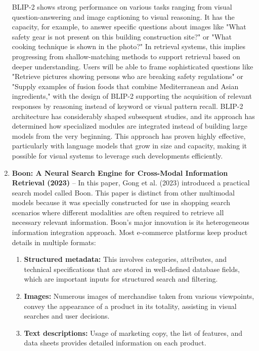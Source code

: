 \documentclass[conference]{IEEEtran}
\begin{document}
\begin{enumerate}
BLIP-2 shows strong performance on various tasks ranging from visual question-answering and image captioning to visual reasoning. It has the capacity, for example, to answer specific questions about images like "What safety gear is not present on this building construction site?" or "What cooking technique is shown in the photo?"
In retrieval systems, this implies progressing from shallow-matching methods to support retrieval based on deeper understanding. Users will be able to frame sophisticated questions like "Retrieve pictures showing persons who are breaking safety regulations" or "Supply examples of fusion foods that combine Mediterranean and Asian ingredients," with the design of BLIP-2 supporting the acquisition of relevant responses by reasoning instead of keyword or visual pattern recall.
BLIP-2 architecture has considerably shaped subsequent studies, and its approach has determined how specialized modules are integrated instead of building large models from the very beginning. This approach has proven highly effective, particularly with language models that grow in size and capacity, making it possible for visual systems to leverage such developments efficiently.

\item \textbf{Boon: A Neural Search Engine for Cross-Modal Information Retrieval (2023)} – In this paper, Gong et al. \cite{gong2023boon} (2023) introduced a practical search model called Boon. This paper is distinct from other multimodal models because it was specially constructed for use in shopping search scenarios where different modalities are often required to retrieve all necessary relevant information.
Boon’s major innovation is its heterogeneous information integration approach. Most e-commerce platforms keep product details in multiple formats:

\begin{enumerate}
\item \textbf{Structured metadata:} This involves categories, attributes, and technical specifications that are stored in well-defined database fields, which are important inputs for structured search and filtering.

\item \textbf{Images:} Numerous images of merchandise taken from various viewpoints, convey the appearance of a product in its totality, assisting in visual searches and user decisions.

\item \textbf{Text descriptions:} Usage of marketing copy, the list of features, and data sheets provides detailed information on each product.


\end{enumerate}
\end{enumerate}
\end{document}
